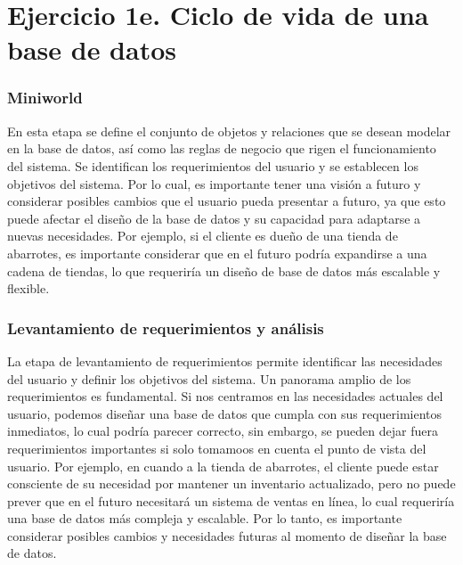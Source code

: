 
\section*{Ejercicio 1e. Ciclo de vida de una base de datos}

\noident

\vspace{0.3cm}

\subsubsection*{\textcolor{unamblue}{Miniworld}}
En esta etapa se define el conjunto de objetos y relaciones que se desean modelar en la base de datos, así como las reglas de negocio que rigen el funcionamiento del sistema. 
Se identifican los requerimientos del usuario y se establecen los objetivos del sistema. Por lo cual, es importante tener una visión a futuro y considerar posibles cambios
que el usuario pueda presentar a futuro, ya que esto puede afectar el diseño de la base de datos y su capacidad para adaptarse a nuevas necesidades. Por ejemplo, si el cliente
es dueño de una tienda de abarrotes, es importante considerar que en el futuro podría expandirse a una cadena de tiendas, lo que requeriría un diseño de base de datos más escalable y flexible.

\vspace{0.3cm} 

\subsubsection*{\textcolor{unamblue}{Levantamiento de requerimientos y análisis}}
La etapa de levantamiento de requerimientos permite identificar las necesidades del usuario y definir los objetivos del sistema. Un panorama amplio de los requerimientos es fundamental. 
Si nos centramos en las necesidades actuales del usuario, podemos diseñar una base de datos que cumpla con sus requerimientos inmediatos, lo cual podría parecer correcto, sin embargo,
se pueden dejar fuera requerimientos importantes si solo tomamoos en cuenta el punto de vista del usuario. Por ejemplo, en cuando a la tienda de abarrotes, el cliente puede estar consciente 
de su necesidad por mantener un inventario actualizado, pero no puede prever que en el futuro necesitará un sistema de ventas en línea, lo cual requeriría una base de datos más compleja y escalable. 
Por lo tanto, es importante considerar posibles cambios y necesidades futuras al momento de diseñar la base de datos.

